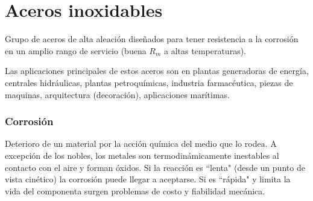 \part{Aceros inoxidables}
Grupo de aceros de alta aleación diseñados para tener resistencia a la corrosión en un amplio rango de servicio (buena $R_m$ a altas temperaturas).

Las aplicaciones principales de estos aceros son en plantas generadoras de energía, centrales hidráulicas, plantas petroquímicas, industria farmacéutica, piezas de maquinas, arquitectura (decoración), aplicaciones marítimas.

\section{Corrosión}
Deterioro de un material por la acción química del medio que lo rodea. A excepción de los nobles, los metales son termodinámicamente inestables al contacto con el aire y forman óxidos. Si la reacción es ``lenta"{} (desde un punto de vista cinético) la corrosión puede llegar a aceptarse. Si es ``rápida"{} y limita la vida del componenta surgen problemas de costo y fiabilidad mecánica.

